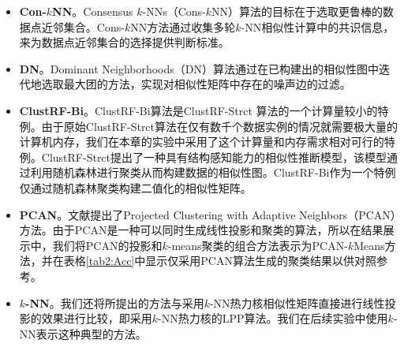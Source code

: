 \begin{itemize}
	\item \textbf{Con-$k$NN}。Consensus $k$-NNs（Cons-$k$NN）算法\cite{premachandran2013consensus}的目标在于选取更鲁棒的数据点近邻集合。Cons-$k$NN方法通过收集多轮$k$-NN相似性计算中的共识信息，来为数据点近邻集合的选择提供判断标准。
	\item \textbf{DN}。Dominant Neighborhoods（DN）算法\cite{pavan2007dominant}通过在已构建出的相似性图中迭代地选取最大团的方法，实现对相似性矩阵中存在的噪声边的过滤。
	\item \textbf{ClustRF-Bi}。ClustRF-Bi算法\cite{criminisi2012decision,pei2013unsupervised}是ClustRF-Strct \cite{zhu2014constructing}算法的一个计算量较小的特例。由于原始ClustRF-Strct算法在仅有数千个数据实例的情况就需要极大量的计算机内存，我们在本章的实验中采用了这个计算量和内存需求相对可行的特例。ClustRF-Strct提出了一种具有结构感知能力的相似性推断模型，该模型通过利用随机森林进行聚类从而构建数据的相似性图。ClustRF-Bi作为一个特例仅通过随机森林聚类构建二值化的相似性矩阵。
	\item \textbf{PCAN}。文献\parencite{nie2014clustering}提出了Projected Clustering with Adaptive Neighbors（PCAN）方法。由于PCAN是一种可以同时生成线性投影和聚类的算法，所以在结果展示中，我们将PCAN的投影和$k$-means聚类的组合方法表示为PCAN-$k$Means方法，并在表格\ref{tab2:Acc}中显示仅采用PCAN算法生成的聚类结果以供对照参考。
	\item \textbf{$k$-NN}。我们还将所提出的方法与采用$k$-NN热力核相似性矩阵直接进行线性投影的效果进行比较，即采用$k$-NN热力核的LPP算法。我们在后续实验中使用$k$-NN表示这种典型的方法。


\end{itemize}
